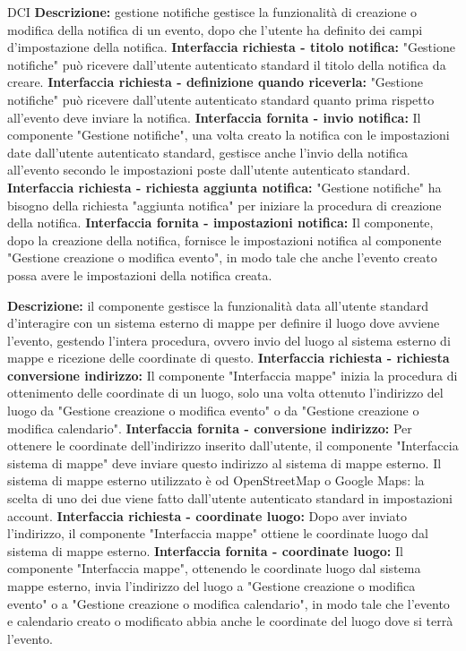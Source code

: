 \begin{listaPersonale}{DCI}
    \textbf{Descrizione:} gestione notifiche gestisce la funzionalità di creazione o modifica della notifica di un evento, dopo che l'utente ha definito dei campi d'impostazione della notifica.
    \textbf{Interfaccia richiesta - titolo notifica:} "Gestione notifiche" può ricevere dall'utente autenticato standard il titolo della notifica da creare.
    \textbf{Interfaccia richiesta - definizione quando riceverla:} "Gestione notifiche" può ricevere dall'utente autenticato standard quanto prima rispetto all'evento deve inviare la notifica.
    \textbf{Interfaccia fornita - invio notifica:} Il componente "Gestione notifiche", una volta creato la notifica con le impostazioni date dall'utente autenticato standard, gestisce anche l'invio della notifica all'evento secondo le impostazioni poste dall'utente autenticato standard.
    \textbf{Interfaccia richiesta - richiesta aggiunta notifica:} "Gestione notifiche" ha bisogno della richiesta "aggiunta notifica" per iniziare la procedura di creazione della notifica.
    \textbf{Interfaccia fornita - impostazioni notifica:} Il componente, dopo la creazione della notifica, fornisce le impostazioni notifica al componente "Gestione creazione o modifica evento", in modo tale che anche l'evento creato possa avere le impostazioni della notifica creata.


    \textbf{Descrizione:} il componente gestisce la funzionalità data all'utente standard d'interagire con un sistema esterno di mappe per definire il luogo dove avviene l'evento, gestendo l'intera procedura, ovvero invio del luogo al sistema esterno di mappe e ricezione delle coordinate di questo.
    \textbf{Interfaccia richiesta - richiesta conversione indirizzo:}   Il componente "Interfaccia mappe" inizia la procedura di ottenimento delle coordinate di un luogo, solo una volta ottenuto l'indirizzo del luogo da "Gestione creazione o modifica evento" o da "Gestione creazione o modifica calendario".
    \textbf{Interfaccia fornita - conversione indirizzo:} Per ottenere le coordinate dell'indirizzo inserito dall'utente, il componente "Interfaccia sistema di mappe" deve inviare questo indirizzo al sistema di mappe esterno. Il sistema di mappe esterno utilizzato è od OpenStreetMap o Google Maps: la scelta di uno dei due viene fatto dall'utente autenticato standard in impostazioni account.
    \textbf{Interfaccia richiesta - coordinate luogo:} Dopo aver inviato l'indirizzo, il componente "Interfaccia mappe" ottiene le coordinate luogo dal sistema di mappe esterno.
    \textbf{Interfaccia fornita - coordinate luogo:} Il componente "Interfaccia mappe", ottenendo le coordinate luogo dal sistema mappe esterno, invia l'indirizzo del luogo a "Gestione creazione o modifica evento" o a "Gestione creazione o modifica calendario", in modo tale che l'evento e calendario creato o modificato abbia anche le coordinate del luogo dove si terrà l'evento.



\end{listaPersonale}
